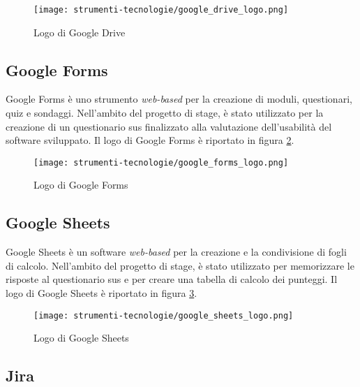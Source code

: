 \begin{figure}[H]
  \centering 
  \texttt{[image: strumenti-tecnologie/google\_drive\_logo.png]}  
  \caption{Logo di Google Drive}
  \label{fig:logo_google_drive}
\end{figure}

\subsection*{Google Forms}

\par Google Forms è uno strumento \textit{web-based} per la creazione di moduli, questionari, quiz e sondaggi. Nell’ambito del progetto di stage, è stato utilizzato per la creazione di un questionario \gls{sus} finalizzato alla valutazione dell’usabilità del software sviluppato. Il logo di Google Forms è riportato in figura \ref{fig:logo_google_forms}.

\begin{figure}[H]
  \centering 
  \texttt{[image: strumenti-tecnologie/google\_forms\_logo.png]} 
  \caption{Logo di Google Forms}
  \label{fig:logo_google_forms}
\end{figure}

\subsection*{Google Sheets}

\par Google Sheets è un software \textit{web-based} per la creazione e la condivisione di fogli di calcolo. Nell’ambito del progetto di stage, è stato utilizzato per memorizzare le risposte al questionario \gls{sus} e per creare una tabella di calcolo dei punteggi. Il logo di Google Sheets è riportato in figura \ref{fig:logo_google_sheets}.

\begin{figure}[H]
  \centering 
  \texttt{[image: strumenti-tecnologie/google\_sheets\_logo.png]} 
  \caption{Logo di Google Sheets}
  \label{fig:logo_google_sheets}
\end{figure}

\subsection*{Jira}

